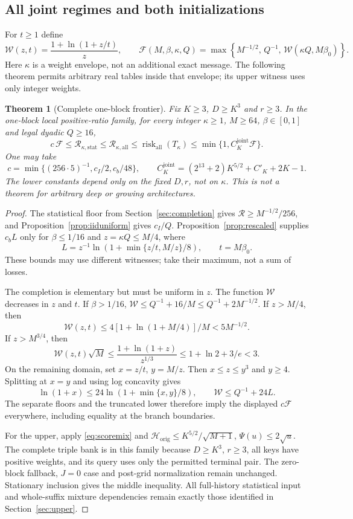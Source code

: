 \documentclass[11pt,letterpaper]{article}
\newtheorem{theorem}{Theorem}[section]
\theoremstyle{definition}\newtheorem{definition}[theorem]{Definition}
\theoremstyle{remark}\newtheorem{remark}[theorem]{Remark}
\newcommand{\betaz}{\beta_0}
\newcommand{\Risk}{\mathcal{R}}
\begin{document}
\subsection{All joint regimes and both initializations}
For $t\ge1$ define
\[
 \mathcal W(z,t)=\frac{1+\ln(1+z/t)}{z},\qquad
 \mathcal F(M,\beta,\kappa,Q)
 =\max\left\{M^{-1/2},\,Q^{-1},\,\mathcal W(\kappa Q,M\betaz)\right\}.
\]
Here $\kappa$ is a weight envelope, not an additional exact message. The following theorem permits arbitrary real tables inside that envelope; its upper witness uses only integer weights.
\begin{theorem}[Complete one-block frontier]\label{thm:joint}
Fix $K\ge3$, $D\ge K^3$ and $r\ge3$. In the one-block local positive-ratio family, for every integer $\kappa\ge1$, $M\ge64$, $\beta\in[0,1]$ and legal dyadic $Q\ge16$,
\begin{equation}\label{eq:joint}
 c\,\mathcal F\le\Risk_{\kappa,\mathrm{stat}}
 \le\Risk_{\kappa,\mathrm{all}}
 \le\operatorname{risk}_{\mathrm{all}}(T_\kappa)
 \le\min\{1,C_K^{\mathrm{joint}}\mathcal F\}.
\end{equation}
One may take
\[
 c=\min\{(256\cdot5)^{-1},c_I/2,c_b/48\},\qquad
 C_K^{\mathrm{joint}}=(2^{13}+2)K^{5/2}+C'_K+2K-1.
\]
The lower constants depend only on the fixed $D,r$, not on $\kappa$. This is not a theorem for arbitrary deep or growing architectures.
\end{theorem}
\begin{proof}
The statistical floor from Section~\ref{sec:completion} gives $\Risk\ge M^{-1/2}/256$, and Proposition~\ref{prop:iiduniform} gives $c_I/Q$. Proposition~\ref{prop:rescaled} supplies $c_bL$ only for $\beta\le1/16$ and $z=\kappa Q\le M/4$, where
\[
 L=z^{-1}\ln(1+\min\{z/t,M/z\}/8),\qquad t=M\betaz.
\]
These bounds may use different witnesses; take their maximum, not a sum of losses.

The completion is elementary but must be uniform in $z$. The function $\mathcal W$ decreases in $z$ and $t$. If $\beta>1/16$,
$\mathcal W\le Q^{-1}+16/M\le Q^{-1}+2M^{-1/2}$.
If $z>M/4$, then
\[
 \mathcal W(z,t)\le4[1+\ln(1+M/4)]/M<5M^{-1/2}.
\]
If $z>M^{3/4}$, then
\[
 \mathcal W(z,t)\sqrt M
 \le\frac{1+\ln(1+z)}{z^{1/3}}
 \le1+\ln2+3/e<3.
\]
On the remaining domain, set $x=z/t$, $y=M/z$. Then $x\le z\le y^3$ and $y\ge4$. Splitting at $x=y$ and using log concavity gives
\[
 \ln(1+x)\le24\ln(1+\min\{x,y\}/8),\qquad
 \mathcal W\le Q^{-1}+24L.
\]
The separate floors and the truncated lower therefore imply the displayed $c\mathcal F$ everywhere, including equality at the branch boundaries.

For the upper, apply \eqref{eq:scoremix} and
$\mathcal H_{\mathrm{orig}}\le K^{5/2}/\sqrt{M+1}$,
$\Psi(u)\le2\sqrt u$. The complete triple bank is in this family because $D\ge K^3$, $r\ge3$, all keys have positive weights, and its query uses only the permitted terminal pair. The zero-block fallback, $J=0$ case and post-grid normalization remain unchanged. Stationary inclusion gives the middle inequality. All full-history statistical input and whole-suffix mixture dependencies remain exactly those identified in Section~\ref{sec:upper}.
\end{proof}
\end{document}
